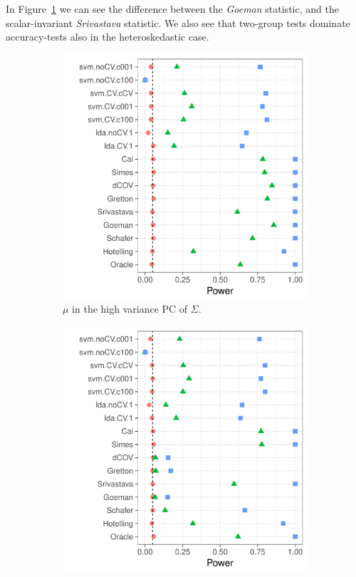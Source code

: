 \documentclass[oupdraft]{bio}
\begin{document}
In Figure~\ref{fig:heteroskedastic_11} we can see the difference between the \emph{Goeman} statistic, and the scalar-invariant \emph{Srivastava} statistic. 
We also see that two-group tests dominate accuracy-tests also in the heteroskedastic case. 

\begin{figure}[h]
	\centering
	\begin{subfigure}[t]{.45\columnwidth}
		\centering
		\includegraphics[width=1\columnwidth]{"file26"}
		\caption{$\mu$ in the high variance PC of $\Sigma$.}  
		\label{fig:heteroskedastic_11}	
	\end{subfigure}
	\begin{subfigure}[t]{0.45\columnwidth}
		\centering
		\includegraphics[width=1\columnwidth]{"file24"}

\end{subfigure}
\end{figure}
\end{document}
